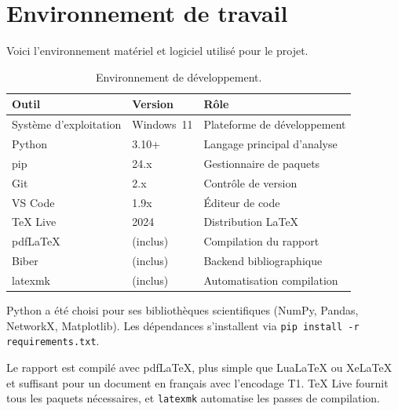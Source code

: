 
\section{Environnement de travail}
\label{sec:environnement}

Voici l'environnement mat\'eriel et logiciel utilis\'e pour le projet.

\begin{table}[H]
\centering
\small
\caption{Environnement de d\'eveloppement.}
\label{tab:environnement}
\begin{tabular}{p{4cm}lp{6cm}}
\toprule
\textbf{Outil} & \textbf{Version} & \textbf{R\^ole} \\
\midrule
Syst\`eme d'exploitation & Windows~11 & Plateforme de d\'eveloppement \\
Python & 3.10+ & Langage principal d'analyse \\
pip & 24.x & Gestionnaire de paquets \\
Git & 2.x & Contr\^ole de version \\
VS Code & 1.9x & \'Editeur de code \\
\TeX{} Live & 2024 & Distribution \LaTeX{} \\
pdf\LaTeX{} & (inclus) & Compilation du rapport \\
Biber & (inclus) & Backend bibliographique \\
latexmk & (inclus) & Automatisation compilation \\
\bottomrule
\end{tabular}
\end{table}

Python a \'et\'e choisi pour ses biblioth\`eques scientifiques (NumPy, Pandas, NetworkX, Matplotlib). Les d\'ependances s'installent via \texttt{pip install -r requirements.txt}.

Le rapport est compil\'e avec pdf\LaTeX{}, plus simple que Lua\LaTeX{} ou Xe\LaTeX{} et suffisant pour un document en fran\c{c}ais avec l'encodage T1. \TeX{} Live fournit tous les paquets n\'ecessaires, et \texttt{latexmk} automatise les passes de compilation.
